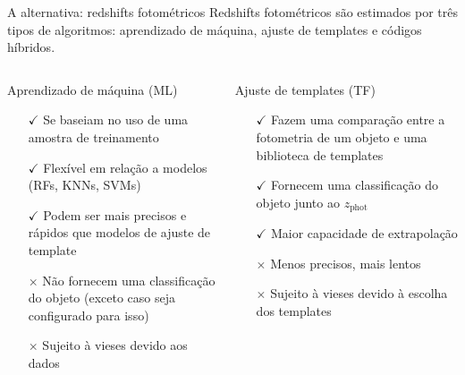 \begin{frame}[c]{A alternativa: redshifts fotométricos}
    Redshifts fotométricos são estimados por três tipos de algoritmos: aprendizado de máquina, ajuste de templates e códigos híbridos.

    \begin{columns}[c]
        \footnotesize
        \begin{column}{0.46\textwidth}
            \begin{splusbox}{Aprendizado de máquina (ML)}
                \begin{itemize}
                    \justifying
                    \item[$\checkmark$] Se baseiam no uso de uma amostra de treinamento
                    \item[$\checkmark$] Flexível em relação a modelos (RFs, KNNs, SVMs)
                    \item[$\checkmark$] Podem ser mais precisos e rápidos que modelos de ajuste de template
                    \item[$\times$] Não fornecem uma classificação do objeto (exceto caso seja configurado para isso)
                    \item[$\times$] Sujeito à vieses devido aos dados
                \end{itemize}
            \end{splusbox}
        \end{column}

        \begin{column}{0.46\textwidth}
            \begin{splusbox}{Ajuste de templates (TF)}
                \begin{itemize}
                    \justifying
                    \item[$\checkmark$] Fazem uma comparação entre a fotometria de um objeto e uma biblioteca de templates
                    \item[$\checkmark$] Fornecem uma classificação do objeto junto ao $z_\text{phot}$
                    \item[$\checkmark$] Maior capacidade de extrapolação
                    \item[$\times$] Menos precisos, mais lentos
                    \item[$\times$] Sujeito à vieses devido à escolha dos templates
                \end{itemize}
            \end{splusbox}
        \end{column}


\end{columns}
\end{frame}
